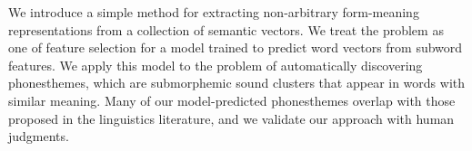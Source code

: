 We introduce a simple method for extracting non-arbitrary form-meaning representations from a collection of semantic vectors. We treat the problem as one of feature selection for a model trained to predict word vectors from subword features. We apply this model to the problem of automatically discovering phonesthemes, which are submorphemic sound clusters that appear in words with similar meaning. Many of our model-predicted phonesthemes overlap with those proposed in the linguistics literature, and we validate our approach with human judgments.
